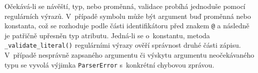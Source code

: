 \documentclass{article}[a4paper]
\begin{document}
    Očekává-li se návěští, typ, nebo proměnná, validace probíhá jednoduše pomocí regulárních výrazů.
    V~případě symbolu může být argument buď proměnná nebo konstanta, což se rozhoduje podle části identifikátoru před znakem \texttt{@} a následně je patřičně upřesněn typ atributu.
    Jedná-li se o~konstantu, metoda \texttt{\_validate\_literal()} regulárními výrazy ověří správnost druhé části zápisu.
    V~případě nesprávně zapsaného argumentu či výskytu argumentu neočekávaného typu se vyvolá výjimka \texttt{ParserError} s~konkrétní chybovou zprávou.
\end{document}
